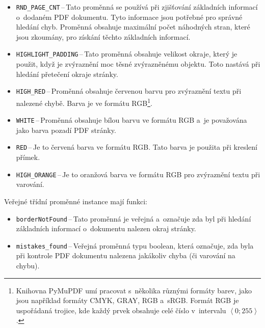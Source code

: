 \begin{itemize}
    \item \texttt{RND\_PAGE\_CNT}\,--\,Tato proměnná se používá při zjišťování
    základních informací o~dodaném PDF dokumentu. Tyto informace jsou potřebné
    pro správné hledání chyb. Proměnná obsahuje maximální počet náhodných stran,
    které jsou zkoumány, pro získání těchto základních informací.

    \item \texttt{HIGHLIGHT\_PADDING}\,--\,Tato proměnná obsahuje velikost okraje,
    který je použit, když je zvýraznění moc těsné zvýrazněnému objektu. Toto
    nastává při hledání přetečení okraje stránky.

    \item \texttt{HIGH\_RED}\,--\,Proměnná obsahuje červenou barvu pro zvýraznění
    textu při nalezené chybě. Barva je ve formátu RGB\footnote{
        Knihovna PyMuPDF umí pracovat s~několika různými formáty barev, jako
        jsou například formáty CMYK, GRAY, RGB a~sRGB. 
        Formát RGB je uspořádaná trojice, kde každý prvek obsahuje celé číslo
        v~intervalu $\left\langle 0;255 \right\rangle$.
    }.

    \item \texttt{WHITE}\,--\,Proměnná obsahuje bílou barvu ve formátu RGB 
    a~je považována jako barva pozadí PDF stránky. 
    
    \item \texttt{RED}\,--\,Je to červená barva ve formátu RGB. Tato barva je
    použita při kreslení přímek.
    
    \item \texttt{HIGH\_ORANGE}\,--\,Je to oranžová barva ve formátu RGB pro
    zvýraznění textu při varování. 
\end{itemize}
Veřejné třídní proměnné instance mají funkci:
\begin{itemize}
    \item \texttt{borderNotFound}\,--\,Tato proměnná je veřejná a~označuje zda byl
    při hledání základních informací o~dokumentu nalezen okraj stránky.

    \item \texttt{mistakes\_found}\,--\,Veřejná proměnná typu boolean, která označuje,
    zda byla při kontrole PDF dokumentu nalezena jakákoliv chyba (či varování
    na chybu).
\end{itemize}



